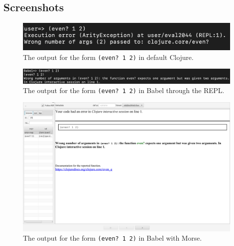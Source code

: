 \documentclass{beamer}
\begin{document}
\subsection{Screenshots}
\begin{frame}
  \begin{figure}
    \centering
    \includegraphics[width=\textwidth]{../resources/CljDefaultEven.png}
    \caption{The output for the form \texttt{(even? 1 2)} in default Clojure.}
    \label{fig:defaultclj}
  \end{figure}
\end{frame}

\begin{frame}
  \begin{figure}
    \centering
    \includegraphics[width=\textwidth, height=0.25\textheight]{../resources/BabelREPL.png}
    \caption{The output for the form \texttt{(even? 1 2)} in Babel through the REPL.}
    \label{fig:BabelREPL}
  \end{figure}
\end{frame}

\begin{frame}
  \begin{figure}
    \centering
    \includegraphics[width=\textwidth]{../resources/BabelViewerExample.png}
    \caption{The output for the form \texttt{(even? 1 2)} in Babel with Morse.}
    \label{fig:defaultclj}
  \end{figure}
\end{frame}
\end{document}

